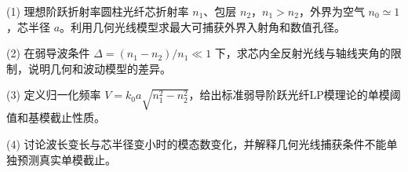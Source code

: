 (1) 理想阶跃折射率圆柱光纤芯折射率 \(n_1\)、包层 \(n_2\)，\(n_1>n_2\)，外界为空气 \(n_0\simeq1\)，芯半径 \(a\)。利用几何光线模型求最大可捕获外界入射角和数值孔径。

(2) 在弱导波条件 \(\Delta=(n_1-n_2)/n_1\ll1\) 下，求芯内全反射光线与轴线夹角的限制，说明几何和波动模型的差异。

(3) 定义归一化频率 \(V=k_0a\sqrt{n_1^2-n_2^2}\)，给出标准弱导阶跃光纤LP模理论的单模阈值和基模截止性质。

(4) 讨论波长变长与芯半径变小时的模态数变化，并解释几何光线捕获条件不能单独预测真实单模截止。
